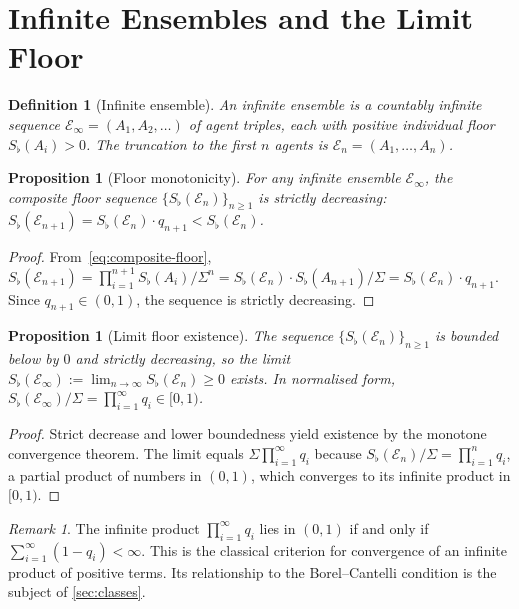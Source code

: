 \documentclass[twocolumn,11pt,a4paper]{article}
\newtheorem{proposition}[theorem]{Proposition}
\newtheorem{definition}[theorem]{Definition}
\theoremstyle{remark}
\newtheorem{remark}[theorem]{Remark}
\newcommand{\Sflat}{S_{\flat}}
\newcommand{\Ens}{\mathcal{E}}
\begin{document}
\section{Infinite Ensembles and the Limit Floor}
\label{sec:infinite}

\begin{definition}[Infinite ensemble]
\label{def:infinite-ens}
An \emph{infinite ensemble} is a countably infinite sequence
$\Ens_\infty = (A_1, A_2, \ldots)$ of agent triples, each with positive
individual floor $\Sflat(A_i) > 0$.  The truncation to the first $n$ agents
is $\Ens_n = (A_1,\ldots,A_n)$.
\end{definition}

\begin{proposition}[Floor monotonicity]
\label{prop:monotone}
For any infinite ensemble $\Ens_\infty$, the composite floor sequence
$\{\Sflat(\Ens_n)\}_{n\ge 1}$ is strictly decreasing:
$\Sflat(\Ens_{n+1}) = \Sflat(\Ens_n) \cdot q_{n+1} < \Sflat(\Ens_n)$.
\end{proposition}
\begin{proof}
From~\eqref{eq:composite-floor},
$\Sflat(\Ens_{n+1}) = \prod_{i=1}^{n+1}\Sflat(A_i)/\Sigma^n =
\Sflat(\Ens_n) \cdot \Sflat(A_{n+1})/\Sigma = \Sflat(\Ens_n) \cdot q_{n+1}$.
Since $q_{n+1} \in (0,1)$, the sequence is strictly decreasing.
\end{proof}

\begin{proposition}[Limit floor existence]
\label{prop:limit}
The sequence $\{\Sflat(\Ens_n)\}_{n\ge 1}$ is bounded below by $0$ and
strictly decreasing, so the limit
$\Sflat(\Ens_\infty) := \lim_{n\to\infty} \Sflat(\Ens_n) \ge 0$
exists.  In normalised form, $\Sflat(\Ens_\infty)/\Sigma = \prod_{i=1}^\infty q_i
\in [0,1)$.
\end{proposition}
\begin{proof}
Strict decrease and lower boundedness yield existence by the monotone
convergence theorem.  The limit equals $\Sigma\prod_{i=1}^\infty q_i$ because
$\Sflat(\Ens_n)/\Sigma = \prod_{i=1}^n q_i$, a partial product of numbers
in $(0,1)$, which converges to its infinite product in $[0,1)$.
\end{proof}

\begin{remark}
The infinite product $\prod_{i=1}^\infty q_i$ lies in $(0,1)$ if and only if
$\sum_{i=1}^\infty (1-q_i) < \infty$.  This is the classical criterion for
convergence of an infinite product of positive terms.  Its relationship to
the Borel--Cantelli condition is the subject of \cref{sec:classes}.
\end{remark}
\end{document}
